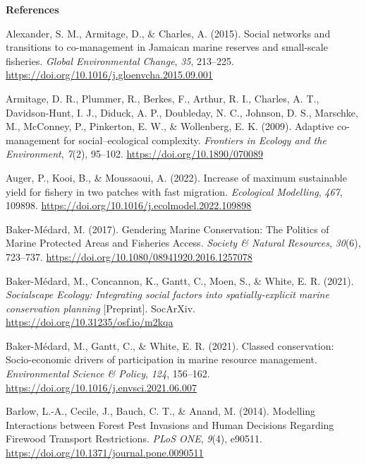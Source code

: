 \documentclass[
  12pt,
]{article}
\newlength{\cslhangindent}
\newenvironment{CSLReferences}[2] %
 {\begin{list}{}{%
  \setlength{\itemindent}{0pt}
  \setlength{\leftmargin}{0pt}
  \setlength{\parsep}{0pt}
  \ifodd #1
   \setlength{\leftmargin}{\cslhangindent}
   \setlength{\itemindent}{-1\cslhangindent}
  \fi
  \setlength{\itemsep}{#2\baselineskip}}}
 {\end{list}}
\begin{document}
\textbf{References}

\label{refs}
\begin{CSLReferences}{1}{2}
Alexander, S. M., Armitage, D., \& Charles, A. (2015). Social networks and transitions to co-management in {Jamaican} marine reserves and small-scale fisheries. \emph{Global Environmental Change}, \emph{35}, 213--225. \url{https://doi.org/10.1016/j.gloenvcha.2015.09.001}

Armitage, D. R., Plummer, R., Berkes, F., Arthur, R. I., Charles, A. T., Davidson-Hunt, I. J., Diduck, A. P., Doubleday, N. C., Johnson, D. S., Marschke, M., McConney, P., Pinkerton, E. W., \& Wollenberg, E. K. (2009). Adaptive co-management for social--ecological complexity. \emph{Frontiers in Ecology and the Environment}, \emph{7}(2), 95--102. \url{https://doi.org/10.1890/070089}

Auger, P., Kooi, B., \& Moussaoui, A. (2022). Increase of maximum sustainable yield for fishery in two patches with fast migration. \emph{Ecological Modelling}, \emph{467}, 109898. \url{https://doi.org/10.1016/j.ecolmodel.2022.109898}

Baker-Médard, M. (2017). Gendering {Marine Conservation}: {The Politics} of {Marine Protected Areas} and {Fisheries Access}. \emph{Society \& Natural Resources}, \emph{30}(6), 723--737. \url{https://doi.org/10.1080/08941920.2016.1257078}

Baker-Médard, M., Concannon, K., Gantt, C., Moen, S., \& White, E. R. (2021). \emph{Socialscape {Ecology}: {Integrating} social factors into spatially-explicit marine conservation planning} {[}Preprint{]}. SocArXiv. \url{https://doi.org/10.31235/osf.io/m2kqa}

Baker-Médard, M., Gantt, C., \& White, E. R. (2021). Classed conservation: {Socio-economic} drivers of participation in marine resource management. \emph{Environmental Science \& Policy}, \emph{124}, 156--162. \url{https://doi.org/10.1016/j.envsci.2021.06.007}

Barlow, L.-A., Cecile, J., Bauch, C. T., \& Anand, M. (2014). Modelling {Interactions} between {Forest Pest Invasions} and {Human Decisions Regarding Firewood Transport Restrictions}. \emph{PLoS ONE}, \emph{9}(4), e90511. \url{https://doi.org/10.1371/journal.pone.0090511}


\end{CSLReferences}
\end{document}
